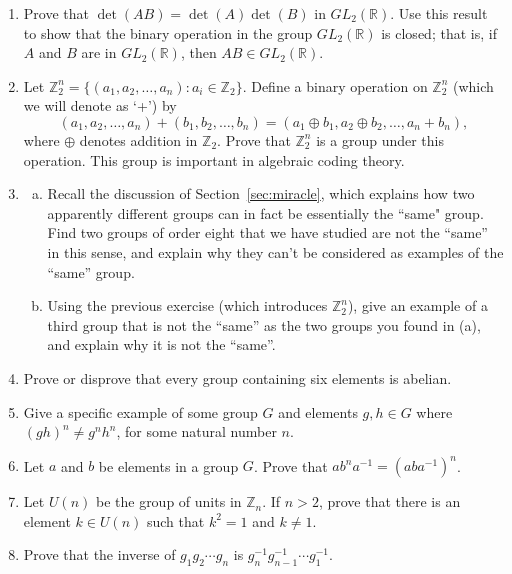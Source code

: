 {\begin{enumerate}
 
\item\label{ex:eoc:9}
Prove that $\det(AB) = \det(A) \det(B)$ in $GL_2({\mathbb R})$. Use this
result to show that the binary operation in the group $GL_2({\mathbb R})$
is closed; that is, if $A$ and $B$ are in $GL_2({\mathbb R})$, then $AB
\in GL_2({\mathbb R})$.
 
 
\item\label{ex:eoc:10}
Let ${\mathbb Z}_2^n = \{ (a_1, a_2, \ldots, a_n) : a_i \in {\mathbb Z}_2
\}$. Define a binary operation on ${\mathbb Z}_2^n$ (which we will denote as `+') by
\[
(a_1, a_2, \ldots, a_n)
+
(b_1, b_2, \ldots, b_n)
=
(a_1 \oplus  b_1, a_2 \oplus b_2, \ldots, a_n+b_n),
\]
where $\oplus$ denotes addition in ${\mathbb Z}_2$.
Prove that ${\mathbb Z}_2^n$ is a group under this operation. This group
is important in algebraic coding theory. 
 
\item\label{ex:eoc:11}
\begin{enumerate}[(a)]
\item
Recall the discussion of Section~\ref{sec:miracle}, which explains how two apparently different groups can in fact be essentially the ``same" group. Find two groups of order eight that we have studied are not the ``same'' in this sense, and explain why they can't be considered as examples of the ``same'' group.  
\item
Using the previous exercise (which introduces ${\mathbb Z}_2^n$), give an example of a third group that is not the ``same'' as the two groups you found in (a), and explain why it is not the ``same''.
\end{enumerate}

 
\item
Prove or disprove that every group containing six elements is abelian.
 
 
\item
Give a specific example of some group $G$ and elements $g, h \in G$
where $(gh)^n \neq g^nh^n$, for some natural number $n$. 
 
 

  
\item
Let $a$ and $b$ be elements in a group $G$.  Prove that $ab^na^{-1} =
(aba^{-1})^n$. 
 
 
\item
Let $U(n)$ be the group of units in ${\mathbb Z}_n$. If $n>2$, prove that
there is an element $k \in U(n)$ such that $k^2 = 1$ and $k \neq 1$.
 
 
\item\label{ex:eoc:15}
Prove that the inverse of $g _1 g_2 \cdots g_n$ is $g_n^{-1}
g_{n-1}^{-1} \cdots g_1^{-1}$. 
 

\end{enumerate}}
